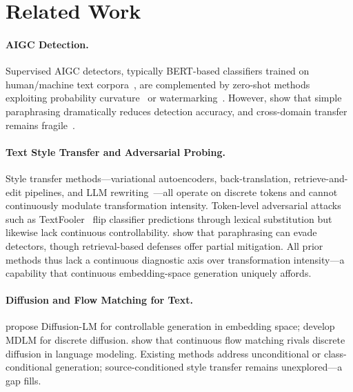 \section{Related Work}
\label{sec:related}

\paragraph{AIGC Detection.}
Supervised AIGC detectors, typically BERT-based classifiers trained
on human/machine text corpora~\citep{devlin2019bert, he2023mgtbench},
are complemented by zero-shot methods exploiting probability
curvature~\citep{mitchell2023detectgpt} or
watermarking~\citep{kirchenbauer2023watermark}.
However, \citet{sadasivan2023aigenerated} show that simple
paraphrasing dramatically reduces detection accuracy, and
cross-domain transfer remains
fragile~\citep{he2023mgtbench, yang2024survey}.

\paragraph{Text Style Transfer and Adversarial Probing.}
Style transfer methods---variational autoencoders, back-translation,
retrieve-and-edit pipelines, and LLM
rewriting~\citep{lyu2021style}---all operate on discrete tokens and
cannot continuously modulate transformation intensity.
Token-level adversarial attacks such as
TextFooler~\citep{jin2020bert} flip classifier predictions through
lexical substitution but likewise lack continuous controllability.
\citet{krishna2024paraphrasing} show that paraphrasing can evade
detectors, though retrieval-based defenses offer partial mitigation.
All prior methods thus lack a continuous diagnostic axis over
transformation intensity---a capability that continuous
embedding-space generation uniquely affords.

\paragraph{Diffusion and Flow Matching for Text.}
\citet{li2022diffusion} propose Diffusion-LM for controllable
generation in embedding space; \citet{lou2024discrete} develop MDLM
for discrete diffusion. \citet{chen2026langflow} show that continuous
flow matching rivals discrete diffusion in language modeling.
Existing methods address unconditional or class-conditional
generation; source-conditioned style transfer remains
unexplored---a gap \styleshield{} fills.